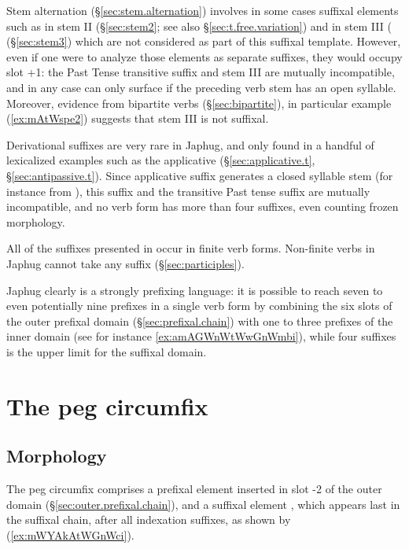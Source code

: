 Stem alternation (§\ref{sec:stem.alternation}) involves in some cases suffixal elements such as  in stem II (§\ref{sec:stem2}; see also §\ref{sec:t.free.variation}) and  in stem III ( (§\ref{sec:stem3}) which are not considered as part of this suffixal template. However, even if one were to analyze those elements as separate suffixes, they would occupy slot +1: the  Past Tense transitive suffix and stem III are mutually incompatible, and in any case  can only surface if the preceding verb stem has an open syllable. Moreover, evidence from bipartite verbs (§\ref{sec:bipartite}), in particular example (\ref{ex:mAtWspe2}) suggests that stem III is not suffixal.

Derivational suffixes are very rare in Japhug, and only found in a handful of lexicalized examples such as the  applicative (§\ref{sec:applicative.t}, §\ref{sec:antipassive.t}). Since applicative suffix generates a closed syllable stem (for instance  from ), this suffix and the transitive Past tense  suffix are mutually incompatible, and no verb form has more than four suffixes, even counting frozen morphology.

All of the suffixes presented in  occur in finite verb forms. Non-finite verbs in Japhug cannot take any suffix (§\ref{sec:participles}).

Japhug clearly is a strongly prefixing language: it is possible to reach seven to even potentially nine prefixes in a single verb form by combining the six slots of the outer prefixal domain (§\ref{sec:prefixal.chain}) with one to three prefixes of the inner domain (see for instance \ref{ex:amAGWnWtWwGnWmbi}), while four suffixes is the upper limit for the suffixal domain. 

\section{The peg circumfix} \label{sec:peg.circumfix}
\subsection{Morphology}
The peg circumfix  comprises a prefixal element  inserted in slot -2 of the outer domain (§\ref{sec:outer.prefixal.chain}), and a suffixal element , which appears last in the suffixal chain, after all indexation suffixes, as shown by (\ref{ex:mWYAkAtWGnWci}).

